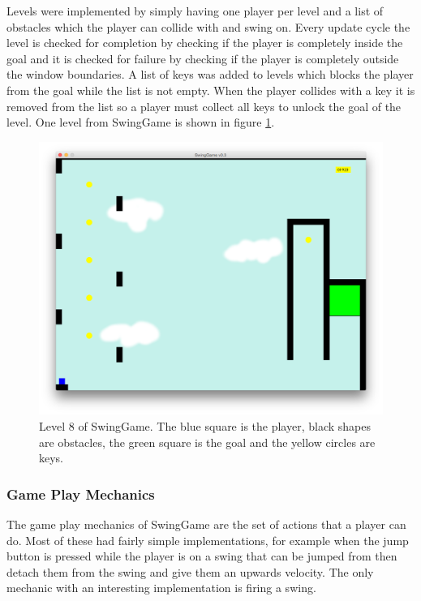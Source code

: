 \documentclass[]{report}
\begin{document}
			Levels were implemented by simply having one player per level and a list of obstacles which the player can collide with and swing on. Every update cycle the level is checked for completion by checking if the player is completely inside the goal and it is checked for failure by checking if the player is completely outside the window boundaries. A list of keys was added to levels which blocks the player from the goal while the list is not empty. When the player collides with a key it is removed from the list so a player must collect all keys to unlock the goal of the level. One level from SwingGame is shown in figure \ref{levelexample}.
			
			\begin{figure}[H]
				\centering
				\includegraphics[scale=0.25]{level8}
				\caption{Level 8 of SwingGame. The blue square is the player, black shapes are obstacles, the green square is the goal and the yellow circles are keys.}
				\label{levelexample}
			\end{figure}
			\subsubsection{Game Play Mechanics}
			The game play mechanics of SwingGame are the set of actions that a player can do. Most of these had fairly simple implementations, for example when the jump button is pressed while the player is on a swing that can be jumped from then detach them from the swing and give them an upwards velocity. The only mechanic with an interesting implementation is firing a swing.
			
\end{document}
